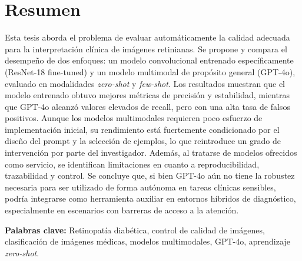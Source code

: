 \chapter*{Resumen}

\par Esta tesis aborda el problema de evaluar automáticamente la calidad adecuada para la interpretación clínica de imágenes retinianas. Se propone y compara el desempeño de dos enfoques: un modelo convolucional entrenado específicamente (ResNet-18 fine-tuned) y un modelo multimodal de propósito general (GPT-4o), evaluado en modalidades \textit{zero-shot} y \textit{few-shot}. Los resultados muestran que el modelo entrenado obtuvo mejores métricas de precisión y estabilidad, mientras que GPT-4o alcanzó valores elevados de recall, pero con una alta tasa de falsos positivos. Aunque los modelos multimodales requieren poco esfuerzo de implementación inicial, su rendimiento está fuertemente condicionado por el diseño del prompt y la selección de ejemplos, lo que reintroduce un grado de intervención por parte del investigador. Además, al tratarse de modelos ofrecidos como servicio, se identifican limitaciones en cuanto a reproducibilidad, trazabilidad y control. Se concluye que, si bien GPT-4o aún no tiene la robustez necesaria para ser utilizado de forma autónoma en tareas clínicas sensibles, podría integrarse como herramienta auxiliar en entornos híbridos de diagnóstico, especialmente en escenarios con barreras de acceso a la atención.

\vspace{1em}
\noindent
\textbf{Palabras clave:} Retinopatía diabética, control de calidad de imágenes, \\
clasificación de imágenes médicas, modelos multimodales, GPT-4o, aprendizaje \textit{zero-shot}.
